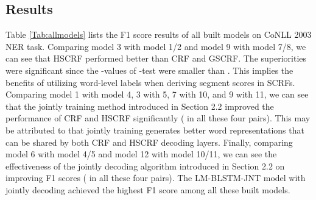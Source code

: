 \documentclass[11pt,a4paper]{article}
\begin{document}
\subsection{Results}
Table \ref{Tab:allmodels} lists the F1 score results of all built models on CoNLL 2003 NER task.
Comparing model 3 with model 1/2 and model 9 with model 7/8,  we can see that HSCRF performed better than CRF and GSCRF.
The superiorities were significant since the -values of -test were smaller than . This implies the benefits of utilizing word-level labels when deriving segment scores in SCRFs.
Comparing model 1 with model 4, 3 with 5, 7 with 10, and 9 with 11, we can see that the jointly training method introduced in Section 2.2 improved the performance of CRF and HSCRF significantly ( in all these four pairs).
This may be attributed to that jointly training generates better word representations that can be shared by both CRF and HSCRF decoding layers.
Finally, comparing model 6 with model 4/5 and model 12 with model 10/11, we can see the effectiveness of the jointly decoding algorithm introduced in Section 2.2
on improving F1 scores ( in all these four pairs).
The LM-BLSTM-JNT model with jointly decoding achieved the highest F1 score among all these built models.
\end{document}
